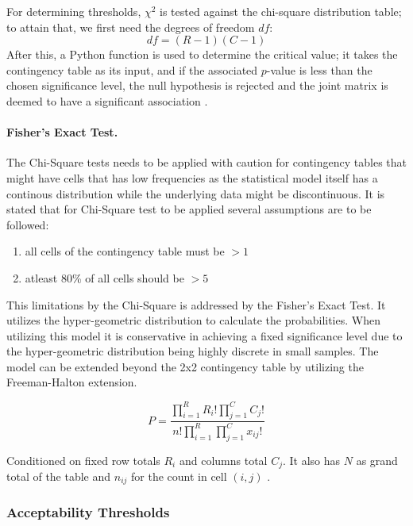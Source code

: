 For determining thresholds, $\chi^2$ is tested against the chi-square
distribution table; to attain that, we first need the degrees of freedom $df$:
\begin{equation}
	df = (R - 1)(C - 1)
	\label{eq:df}
\end{equation}
After this, a Python function is used to determine the critical value; it takes
the contingency table as its input, and if the associated $p$-value is less
than the chosen significance level, the null hypothesis is rejected and the
joint matrix is deemed to have a significant association \parencite{singh2020}.

\paragraph{Fisher's Exact Test.} 
The Chi-Square tests needs to be applied with caution for contingency tables that might have cells that has low frequencies as the statistical model itself has a continous distribution while the underlying data might be discontinuous. It is stated that for Chi-Square test to be applied several assumptions are to be followed:
\begin{enumerate}
	\item all cells of the contingency table must be $>1$
	\item atleast 80\% of all cells should be $>5$
\end{enumerate}

This limitations by the Chi-Square is addressed by the Fisher's Exact Test. It utilizes the hyper-geometric distribution to calculate the probabilities. When utilizing this model it is conservative in achieving a fixed significance level due to the hyper-geometric distribution being highly discrete in small samples. The model can be extended beyond the 2x2 contingency table by utilizing the Freeman-Halton extension\parencite{mays2026use}.

\begin{equation}
	P = \frac{\prod_{i=1}^{R} R_i! \prod_{j=1}^{C} C_j!}{n! \prod_{i=1}^{R} \prod_{j=1}^{C} x_{ij}!}	
	\label{eq:fisher}
\end{equation}

Conditioned on fixed row totals $R_i$ and columns total $C_j$. It also has $N$ as grand total of the table and $n_{ij}$ for the count in cell $(i,j)$ \parencite{metricgate2026freeman}.

\subsubsection{Acceptability Thresholds}

